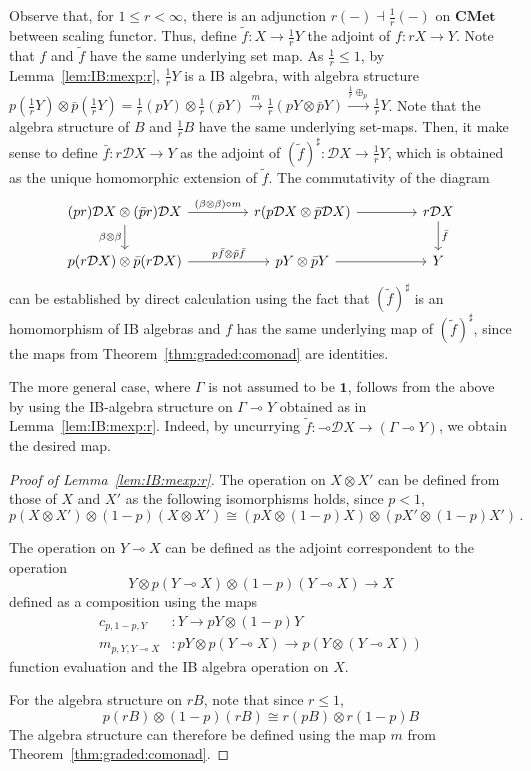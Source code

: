 \documentclass[a4paper,UKenglish,cleveref, autoref, thm-restate]{lipics-v2021}
\newcommand{\lol}{\mathbin{\multimap}}
\newcommand{\cat}[1]{\mathbf{#1}}
\newcommand{\CMet}{\cat{CMet}}
\newcommand{\mprod}{\otimes}
\newcommand{\mexp}{\lol}
\newcommand{\unit}{\mathbf{1}}
\newcommand{\D}{\mathcal{D}}
\newcommand{\scaling}{}
\newcommand{\iso}{\cong}
\newcommand{\asmap}{\beta} %
\begin{document}
\begin{description}[wide, font=\sc]
\item[Case $1 < r < \infty$:] 
Observe that, for $1 \leq r < \infty$, there is an adjunction $r \scaling (-) \dashv \frac1r\scaling(-)$ on $\CMet$ between scaling functor. Thus, define
$\tilde f\colon X \to \frac1r Y$ the adjoint of $f\colon rX \to Y$. Note that $f$ and $\tilde f$ have the same underlying set map. As $\frac1r \leq 1$, by Lemma~\ref{lem:IB:mexp:r}, $\frac1rY$ is a IB algebra, with algebra structure 
$p (\frac1rY) \mprod \bar{p} (\frac1rY) =  \frac1r(pY) \mprod \frac1r(\bar{p} Y) \xrightarrow{m} \frac1r (p Y \mprod \bar{p} Y) \xrightarrow{\frac1r \oplus_p} \frac1r Y$. Note that the algebra structure of $B$ and $\frac1rB$ have the same underlying set-maps.
Then, it make sense to define $\bar f \colon r\D X \to Y$ as the adjoint of  $(\tilde{f})^\sharp \colon \D X \to \frac1r Y$, which is obtained as the unique homomorphic extension of $\tilde{f}$. The commutativity of the diagram
\[
 \begin{tikzcd}[column sep=10ex]
  (pr)\D X \mprod (\bar pr) \D X \ar{r}{(\asmap\mprod\asmap)\circ m} \arrow[d, "\asmap\mprod\asmap"'] & r(p\D X \mprod \bar p\D X) \ar{r} & r\D X \ar{d}{\bar{f}}  \\
  p(r\D X) \mprod \bar p(r\D X) \ar{r}{p\bar{f} \mprod \bar p \bar{f}} & pY \mprod \bar p Y \ar{r} & Y
 \end{tikzcd}
\] 
can be established by direct calculation using the fact that $(\tilde{f})^\sharp$ is an homomorphism of IB algebras and $f$ has the same underlying map of $(\tilde{f})^\sharp$, since the maps from Theorem~\ref{thm:graded:comonad} are identities.
\end{description}
The more general case, where $\Gamma$ is not assumed to be $\unit$, follows from the above by using the IB-algebra structure on $\Gamma \mexp Y$ obtained as in Lemma~\ref{lem:IB:mexp:r}.
Indeed, by uncurrying $\tilde f \colon \mexp \D X \to (\Gamma \mexp Y)$, we obtain the desired map. 

\begin{proof}[Proof of Lemma~\ref{lem:IB:mexp:r}]
The operation on $X \mprod X'$ can be defined from those of $X$ and $X'$ as the following isomorphisms holds, since $p < 1$,
\[ p(X \mprod X') \mprod (1-p)(X \mprod X') \iso
 (pX \mprod (1-p)X) \mprod (pX' \mprod (1-p)X') \,. \]
 
The operation on $Y \mexp X$ can be defined as the 
adjoint correspondent to the operation 
\[Y\mprod p(Y \mexp X)\mprod (1-p)(Y \mexp X) \to X\] 
defined as a composition using the maps 
\begin{align*}
 c_{p,1-p,Y} & : Y \to pY \mprod (1-p)Y \\
 m_{p,Y, Y \mexp X} & : pY \mprod p(Y \mexp X) \to p(Y\mprod (Y \mexp X)) 
\end{align*}
function evaluation and the IB algebra operation on $X$. 

For the algebra structure on $rB$, note that since $r\leq 1$, 
\[ p(rB) \mprod (1-p)(rB) \iso r(pB) \mprod r(1-p)B
\]
The algebra structure can therefore be defined using the map $m$ from Theorem~\ref{thm:graded:comonad}. %
\end{proof}
\end{document}
